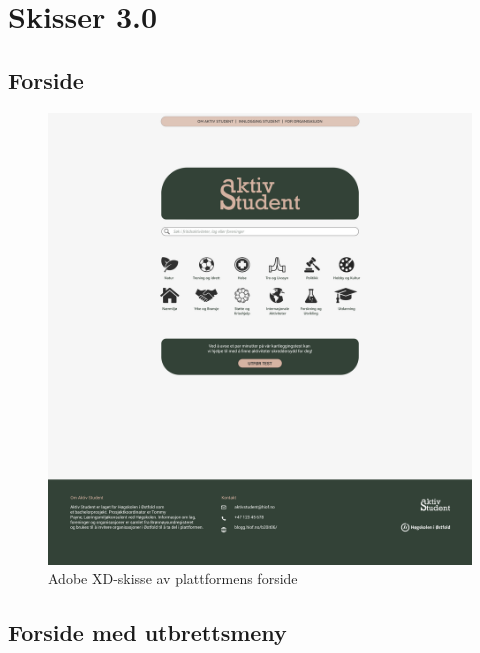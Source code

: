 \chapter{Skisser 3.0}
\label{vedlegg:skisser3}

\section{Forside}

\begin{figure}[H]
\centering
\includegraphics[width=\textwidth]{Illustrasjoner/Skisser-pdf/3.0/3-1-forside.pdf}
\caption{Adobe XD-skisse av plattformens forside}
\label{vedlegg:3-1-forside}
\end{figure}

\section{Forside med utbrettsmeny}

